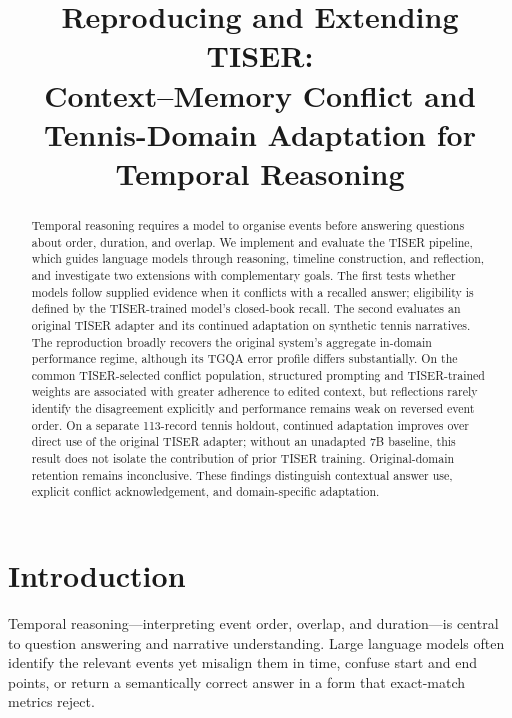 \documentclass[conference]{IEEEtran}
\title{Reproducing and Extending TISER:\\
Context--Memory Conflict and Tennis-Domain Adaptation for Temporal Reasoning}
\author{
\IEEEauthorblockN{
Gabriele Adorni s349308,
Alessandro Casadei s349386, \\
Taha Atabay Cetin s349501
}
\IEEEauthorblockA{
Politecnico di Torino\\
Deep Natural Language Processing
}
}
\begin{document}
\maketitle

\begin{abstract}
Temporal reasoning requires a model to organise events before answering questions about order, duration, and overlap. We implement and evaluate the TISER pipeline, which guides language models through reasoning, timeline construction, and reflection, and investigate two extensions with complementary goals. The first tests whether models follow supplied evidence when it conflicts with a recalled answer; eligibility is defined by the TISER-trained model's closed-book recall. The second evaluates an original TISER adapter and its continued adaptation on synthetic tennis narratives. The reproduction broadly recovers the original system's aggregate in-domain performance regime, although its TGQA error profile differs substantially. On the common TISER-selected conflict population, structured prompting and TISER-trained weights are associated with greater adherence to edited context, but reflections rarely identify the disagreement explicitly and performance remains weak on reversed event order. On a separate 113-record tennis holdout, continued adaptation improves over direct use of the original TISER adapter; without an unadapted 7B baseline, this result does not isolate the contribution of prior TISER training. Original-domain retention remains inconclusive. These findings distinguish contextual answer use, explicit conflict acknowledgement, and domain-specific adaptation.
\end{abstract}

\section{Introduction}

Temporal reasoning---interpreting event order, overlap, and duration---is central to question answering and narrative understanding. Large language models often identify the relevant events yet misalign them in time, confuse start and end points, or return a semantically correct answer in a form that exact-match metrics reject.
\end{document}
